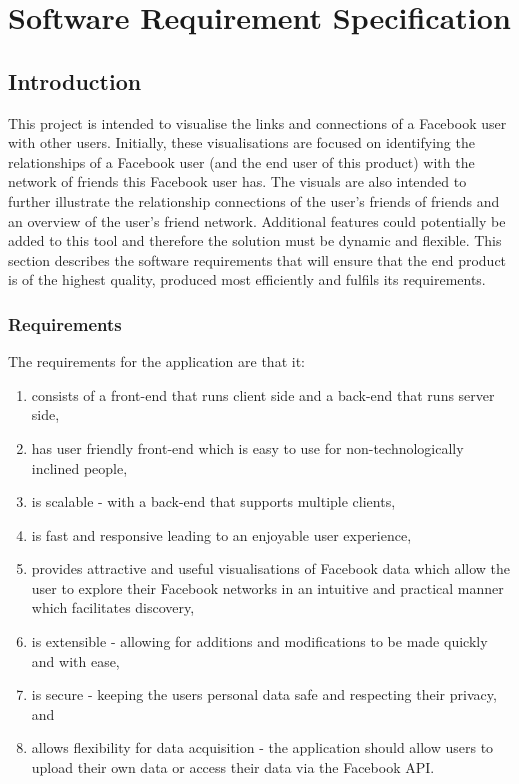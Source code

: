 \documentclass[12pt,onecolumn]{article}
\begin{document}
	\section{Software Requirement Specification} %
	
	\subsection{Introduction}
	This project is intended to visualise the links and connections of a Facebook user with other users. Initially, these visualisations are focused on identifying the relationships of a Facebook user (and the end user of this product) with the network of friends this Facebook user has. The visuals are also intended to further illustrate the relationship connections of the user's friends of friends and an overview of the user's friend network. Additional features could potentially be added to this tool and therefore the solution must be dynamic and flexible. This section describes the software requirements that will ensure that the end product is of the highest quality, produced most efficiently and fulfils its requirements.
	
	\subsubsection{Requirements}
	
	The requirements for the application are that it:
	\begin{enumerate}
		\item consists of a front-end that runs client side and a back-end that runs server side, 
		\item has user friendly front-end which is easy to use for non-technologically inclined people,
		\item is scalable - with a back-end that supports multiple clients,
		\item is fast and responsive leading to an enjoyable user experience,
		\item provides attractive and useful visualisations of Facebook data which allow the user to explore their Facebook networks in an intuitive and practical manner which facilitates discovery,
		\item is extensible - allowing for additions and modifications to be made quickly and with ease,
		\item is secure - keeping the users personal data safe and respecting their privacy, and
		\item allows flexibility for data acquisition - the application should allow users to upload their own data or access their data via the Facebook API.
	\end{enumerate}
	
\end{document}
